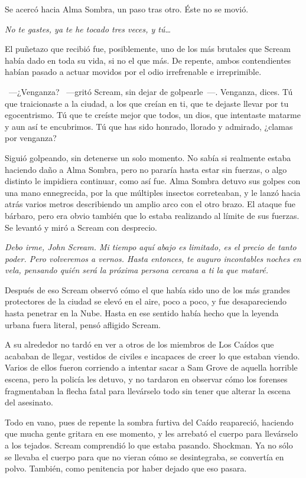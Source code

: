 Se acercó hacia Alma Sombra, un paso tras otro. Éste no se movió.

\emph{No te gastes, ya te he tocado tres veces, y tú\dots}

El puñetazo que recibió fue, posiblemente, uno de los más brutales que Scream había dado en toda su vida, si no el que más. De repente, ambos contendientes habían pasado a actuar movidos por el odio irrefrenable e irreprimible.

~---¿Venganza? ~---gritó Scream, sin dejar de golpearle~---. Venganza, dices. Tú que traicionaste a la ciudad, a los que creían en ti, que te dejaste llevar por tu egocentrismo. Tú que te creíste mejor que todos, un dios, que intentaste matarme y aun así te encubrimos. Tú que has sido honrado, llorado y admirado, ¿clamas por venganza?

Siguió golpeando, sin detenerse un solo momento. No sabía si realmente estaba haciendo daño a Alma Sombra, pero no pararía hasta estar sin fuerzas, o algo distinto le impidiera continuar, como así fue. Alma Sombra detuvo sus golpes con una mano ennegrecida, por la que múltiples insectos correteaban, y le lanzó hacia atrás varios metros describiendo un amplio arco con el otro brazo. El ataque fue bárbaro, pero era obvio también que lo estaba realizando al límite de sus fuerzas. Se levantó y miró a Scream con desprecio.

\emph{Debo irme, John Scream. Mi tiempo aquí abajo es limitado, es el precio de tanto poder. Pero volveremos a vernos. Hasta entonces, te auguro incontables noches en vela, pensando quién será la próxima persona cercana a ti la que mataré.}

Después de eso Scream observó cómo el que había sido uno de los más grandes protectores de la ciudad se elevó en el aire, poco a poco, y fue desapareciendo hasta penetrar en la Nube. Hasta en ese sentido había hecho que la leyenda urbana fuera literal, pensó afligido Scream.

A su alrededor no tardó en ver a otros de los miembros de Los Caídos que acababan de llegar, vestidos de civiles e incapaces de creer lo que estaban viendo. Varios de ellos fueron corriendo a intentar sacar a Sam Grove de aquella horrible escena, pero la policía les detuvo, y no tardaron en observar cómo los forenses fragmentaban la flecha fatal para llevárselo todo sin tener que alterar la escena del asesinato.

Todo en vano, pues de repente la sombra furtiva del Caído reapareció, haciendo que mucha gente gritara en ese momento, y les arrebató el cuerpo para llevárselo a los tejados. Scream comprendió lo que estaba pasando. Shockman. Ya no sólo se llevaba el cuerpo para que no vieran cómo se desintegraba, se convertía en polvo. También, como penitencia por haber dejado que eso pasara.

